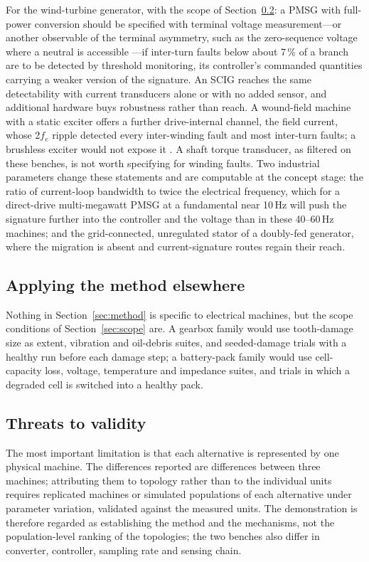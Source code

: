 For the wind-turbine generator, with the scope of Section~\ref{sec:threats}: a PMSG with full-power conversion should be specified with terminal voltage measurement---or another observable of the terminal asymmetry, such as the zero-sequence voltage where a neutral is accessible \citep{Urresty2012}---if inter-turn faults below about 7\,\% of a branch are to be detected by threshold monitoring, its controller's commanded quantities carrying a weaker version of the signature. An SCIG reaches the same detectability with current transducers alone or with no added sensor, and additional hardware buys robustness rather than reach. A wound-field machine with a static exciter offers a further drive-internal channel, the field current, whose 2$f_e$ ripple detected every inter-winding fault and most inter-turn faults; a brushless exciter would not expose it \citep{Neti2009}. A shaft torque transducer, as filtered on these benches, is not worth specifying for winding faults. Two industrial parameters change these statements and are computable at the concept stage: the ratio of current-loop bandwidth to twice the electrical frequency, which for a direct-drive multi-megawatt PMSG at a fundamental near 10\,Hz will push the signature further into the controller and the voltage than in these 40--60\,Hz machines; and the grid-connected, unregulated stator of a doubly-fed generator, where the migration is absent and current-signature routes regain their reach.

\subsection{Applying the method elsewhere}

Nothing in Section~\ref{sec:method} is specific to electrical machines, but the scope conditions of Section~\ref{sec:scope} are. A gearbox family would use tooth-damage size as extent, vibration and oil-debris suites, and seeded-damage trials with a healthy run before each damage step; a battery-pack family would use cell-capacity loss, voltage, temperature and impedance suites, and trials in which a degraded cell is switched into a healthy pack.

\subsection{Threats to validity}\label{sec:threats}

The most important limitation is that each alternative is represented by one physical machine. The differences reported are differences between three machines; attributing them to topology rather than to the individual units requires replicated machines or simulated populations of each alternative under parameter variation, validated against the measured units. The demonstration is therefore regarded as establishing the method and the mechanisms, not the population-level ranking of the topologies; the two benches also differ in converter, controller, sampling rate and sensing chain.


